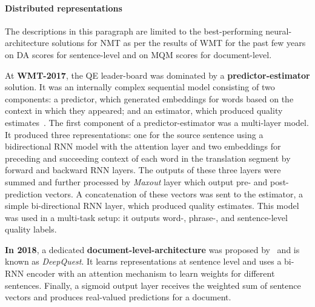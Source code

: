
\paragraph{\label{par:distributed}Distributed representations} 

The descriptions in this paragraph are limited to the best-performing neural-architecture solutions for NMT as per the results of WMT for the past few years on DA scores for sentence-level and on MQM scores for document-level. 

At \textbf{WMT-2017}, the QE leader-board was dominated by a \textbf{predictor-estimator} solution. 
It was an internally complex sequential model consisting of two components: a predictor, which generated embeddings for words based on the context in which they appeared; and an estimator, which produced quality estimates~\cite[POSTECH]{Kim2017b}. 
The first component of a predictor-estimator was a multi-layer model. It produced three representations: one for the source sentence using a bidirectional \gls{RNN} model with the attention layer and two embeddings for preceding and succeeding context of each word in the translation segment by forward and backward RNN layers. The outputs of these three layers were summed and further processed by \textit{Maxout} layer which output pre- and post-prediction vectors. A concatenation of these vectors was sent to the estimator, a simple bi-directional RNN layer, which produced quality estimates.
This model was used in a multi-task setup: it outputs word-, phrase-, and sentence-level quality labels.

\textbf{In 2018}, a dedicated \textbf{document-level-architecture} was proposed by~\citet{Ive2018} and is known as \textit{DeepQuest}. It learns representations at sentence level and %
uses a bi-RNN encoder with an attention mechanism to learn weights for different sentences. Finally, a sigmoid output layer receives the weighted sum of sentence vectors and produces real-valued predictions for a document.

